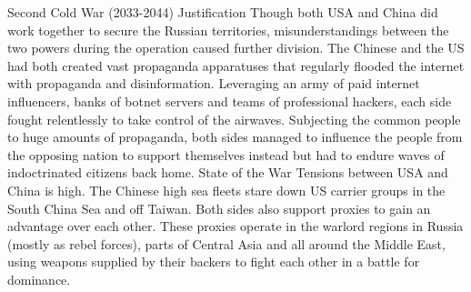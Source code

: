     Second Cold War (2033-2044)
        Justification
            Though both USA and China did work together to secure the Russian territories, misunderstandings between the two powers during the operation caused further division.
            The Chinese and the US had both created vast propaganda apparatuses that regularly flooded the internet with propaganda and disinformation. Leveraging an army of paid internet influencers, banks of botnet servers and teams of professional hackers, each side fought relentlessly to take control of the airwaves. Subjecting the common people to huge amounts of propaganda, both sides managed to influence the people from the opposing nation to support themselves instead but had to endure waves of indoctrinated citizens back home.
        State of the War
            Tensions between USA and China is high. The Chinese high sea fleets stare down US carrier groups in the South China Sea and off Taiwan. Both sides also support proxies to gain an advantage over each other. These proxies operate in the warlord regions in Russia (mostly as rebel forces), parts of Central Asia and all around the Middle East, using  weapons supplied by their backers to fight each other in a battle for dominance.
    
